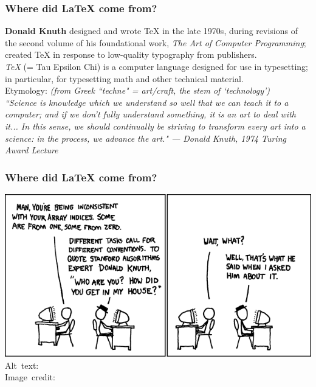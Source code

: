 


\begin{frame}[fragile]
\frametitle{Where did \LaTeX{} come from?}
    \textbf{Donald Knuth} designed and wrote TeX in the late 1970s, during revisions of the second volume of his foundational work, \emph{The Art of Computer Programming}; created TeX in response to low-quality typography from publishers. \\ [\baselineskip]
    \emph{TeX} (= Tau Epsilon Chi) is a computer language designed for use in typesetting; in particular, for typesetting math and other technical material. \\[\baselineskip]
    Etymology: \textit{(from Greek ``techne" = art/craft, the stem of `technology') } \\[\baselineskip]
    {\scriptsize\itshape ``Science is knowledge which we understand so well that we can teach it to a computer; and if we don't fully understand something, it is an art to deal with it... In this sense, we should continually be striving to transform every art into a science: in the process, we advance the art." --- Donald Knuth, 1974 Turing Award Lecture}
\end{frame}


\begin{frame}[fragile]
\frametitle{Where did \LaTeX{} come from?}
\includegraphics[width=\linewidth]{img/knuth_xkcd.png}
\hspace*{10pt}\hbox{\tiny Alt text: } \\
\hspace*{10pt}\hbox{\tiny Image credit:} \\
\end{frame}


